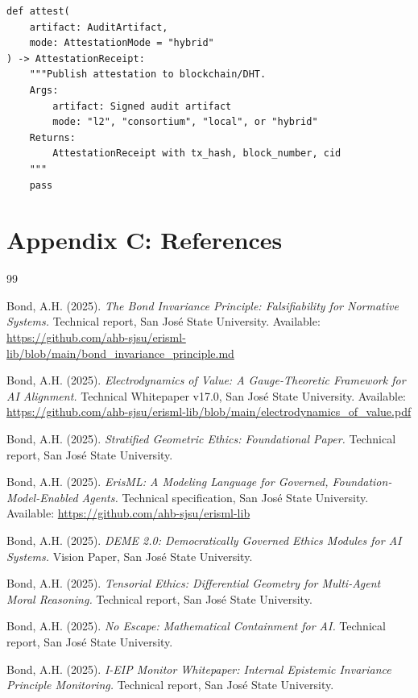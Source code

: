 \documentclass[11pt,letterpaper]{article}
\theoremstyle{definition}
\theoremstyle{remark}
\begin{document}
\begin{lstlisting}
def attest(
    artifact: AuditArtifact,
    mode: AttestationMode = "hybrid"
) -> AttestationReceipt:
    """Publish attestation to blockchain/DHT.
    Args:
        artifact: Signed audit artifact
        mode: "l2", "consortium", "local", or "hybrid"
    Returns:
        AttestationReceipt with tx_hash, block_number, cid
    """
    pass
\end{lstlisting}


\section*{Appendix C: References}

\begin{thebibliography}{99}

Bond, A.H. (2025). \emph{The Bond Invariance Principle: Falsifiability for Normative Systems.} Technical report, San Jos\'e State University. Available: \url{https://github.com/ahb-sjsu/erisml-lib/blob/main/bond_invariance_principle.md}

Bond, A.H. (2025). \emph{Electrodynamics of Value: A Gauge-Theoretic Framework for AI Alignment.} Technical Whitepaper v17.0, San Jos\'e State University. Available: \url{https://github.com/ahb-sjsu/erisml-lib/blob/main/electrodynamics_of_value.pdf}

Bond, A.H. (2025). \emph{Stratified Geometric Ethics: Foundational Paper.} Technical report, San Jos\'e State University.

Bond, A.H. (2025). \emph{ErisML: A Modeling Language for Governed, Foundation-Model-Enabled Agents.} Technical specification, San Jos\'e State University. Available: \url{https://github.com/ahb-sjsu/erisml-lib}

Bond, A.H. (2025). \emph{DEME 2.0: Democratically Governed Ethics Modules for AI Systems.} Vision Paper, San Jos\'e State University.

Bond, A.H. (2025). \emph{Tensorial Ethics: Differential Geometry for Multi-Agent Moral Reasoning.} Technical report, San Jos\'e State University.

Bond, A.H. (2025). \emph{No Escape: Mathematical Containment for AI.} Technical report, San Jos\'e State University.

Bond, A.H. (2025). \emph{I-EIP Monitor Whitepaper: Internal Epistemic Invariance Principle Monitoring.} Technical report, San Jos\'e State University.


\end{thebibliography}
\end{document}
